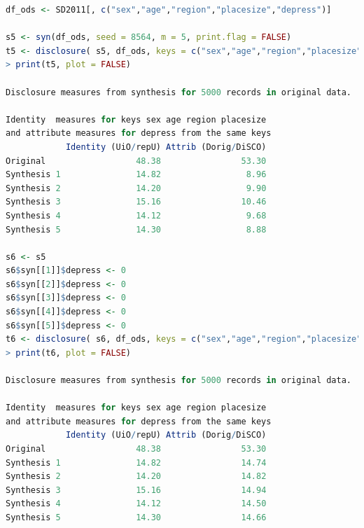 \documentclass[runningheads]{llncs}
\begin{document}
\begin{lstlisting}[language=R]
df_ods <- SD2011[, c("sex","age","region","placesize","depress")]

s5 <- syn(df_ods, seed = 8564, m = 5, print.flag = FALSE)
t5 <- disclosure( s5, df_ods, keys = c("sex","age","region","placesize"), target = "depress", print.flag = FALSE)
> print(t5, plot = FALSE)

Disclosure measures from synthesis for 5000 records in original data.

Identity  measures for keys sex age region placesize 
and attribute measures for depress from the same keys
            Identity (UiO/repU) Attrib (Dorig/DiSCO)
Original                  48.38                53.30
Synthesis 1               14.82                 8.96
Synthesis 2               14.20                 9.90
Synthesis 3               15.16                10.46
Synthesis 4               14.12                 9.68
Synthesis 5               14.30                 8.88

s6 <- s5
s6$syn[[1]]$depress <- 0
s6$syn[[2]]$depress <- 0
s6$syn[[3]]$depress <- 0
s6$syn[[4]]$depress <- 0
s6$syn[[5]]$depress <- 0
t6 <- disclosure( s6, df_ods, keys = c("sex","age","region","placesize"), target = "depress", print.flag = FALSE)
> print(t6, plot = FALSE)

Disclosure measures from synthesis for 5000 records in original data.

Identity  measures for keys sex age region placesize 
and attribute measures for depress from the same keys
            Identity (UiO/repU) Attrib (Dorig/DiSCO)
Original                  48.38                53.30
Synthesis 1               14.82                14.74
Synthesis 2               14.20                14.82
Synthesis 3               15.16                14.94
Synthesis 4               14.12                14.50
Synthesis 5               14.30                14.66
\end{lstlisting}
\end{document}
